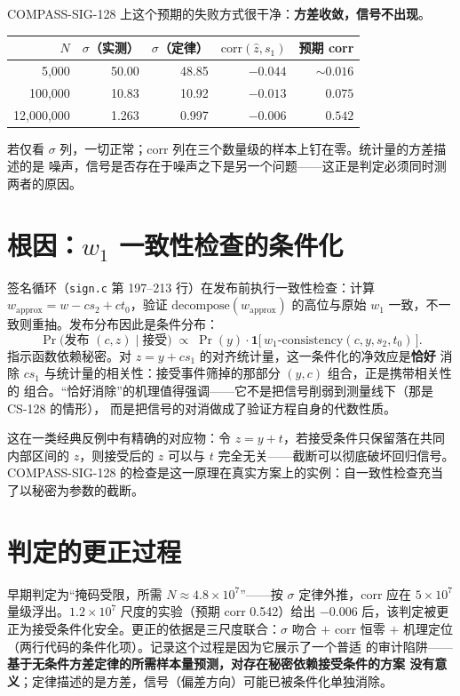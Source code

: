 \documentclass[UTF8,11pt,a4paper]{ctexart}
\newcommand{\code}[1]{\texttt{\small #1}}
\begin{document}
COMPASS-SIG-128 上这个预期的失败方式很干净：\textbf{方差收敛，信号不出现}。

\begin{table}[htbp]\centering\small
\begin{tabular}{@{}rrrrr@{}}
\toprule
$N$ & $\sigma$（实测） & $\sigma$（定律） & $\mathrm{corr}(\hat z, s_1)$ & 预期 corr \\
\midrule
5{,}000 & 50.00 & 48.85 & $-0.044$ & ${\sim}0.016$ \\
100{,}000 & 10.83 & 10.92 & $-0.013$ & $0.075$ \\
12{,}000{,}000 & 1.263 & 0.997 & $-0.006$ & $0.542$ \\
\bottomrule
\end{tabular}
\end{table}

若仅看 $\sigma$ 列，一切正常；corr 列在三个数量级的样本上钉在零。统计量的方差描述的是
噪声，信号是否存在于噪声之下是另一个问题——这正是判定必须同时测两者的原因。

\section{根因：$w_1$ 一致性检查的条件化}

签名循环（\code{sign.c} 第 197--213 行）在发布前执行一致性检查：计算
$w_{\mathrm{approx}} = w - c s_2 + c t_0$，验证 $\mathrm{decompose}(w_{\mathrm{approx}})$
的高位与原始 $w_1$ 一致，不一致则重抽。发布分布因此是条件分布：
\[
\Pr\bigl(\text{发布 }(c, z) \mid \text{接受}\bigr)
\;\propto\; \Pr(y)\cdot \mathbf{1}\bigl[\,w_1\text{-consistency}(c, y, s_2, t_0)\,\bigr].
\]
指示函数依赖秘密。对 $z = y + c s_1$ 的对齐统计量，这一条件化的净效应是\textbf{恰好}
消除 $c s_1$ 与统计量的相关性：接受事件筛掉的那部分 $(y, c)$ 组合，正是携带相关性的
组合。``恰好消除''的机理值得强调——它不是把信号削弱到测量线下（那是 CS-128 的情形），
而是把信号的对消做成了验证方程自身的代数性质。

这在一类经典反例中有精确的对应物：令 $z = y + t$，若接受条件只保留落在共同内部区间的
$z$，则接受后的 $z$ 可以与 $t$ 完全无关——截断可以彻底破坏回归信号。COMPASS-SIG-128
的检查是这一原理在真实方案上的实例：自一致性检查充当了以秘密为参数的截断。

\section{判定的更正过程}

早期判定为``掩码受限，所需 $N \approx 4.8\times10^7$''——按 $\sigma$ 定律外推，corr
应在 $5\times10^7$ 量级浮出。$1.2\times10^7$ 尺度的实验（预期 corr 0.542）给出
$-0.006$ 后，该判定被更正为接受条件化安全。更正的依据是三尺度联合：$\sigma$ 吻合
$+$ corr 恒零 $+$ 机理定位（两行代码的条件化项）。记录这个过程是因为它展示了一个普适
的审计陷阱——\textbf{基于无条件方差定律的所需样本量预测，对存在秘密依赖接受条件的方案
没有意义}；定律描述的是方差，信号（偏差方向）可能已被条件化单独消除。
\end{document}
